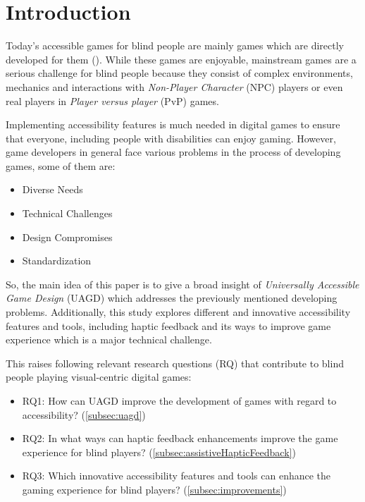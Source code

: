 \documentclass[sigconf,natbib=false,10pt]{acmart}
\begin{document}
	\section{Introduction} \label{sec:introduction}
	Today's accessible games for blind people are mainly games which are directly developed for them (\textcite{goncalves_my_2023}).
	While these games are enjoyable, mainstream games are a serious challenge for blind people because they consist of complex environments, mechanics and interactions with \emph{Non-Player Character} (NPC) players or even real players in \emph{Player versus player} (PvP) games.
	
	Implementing accessibility features is much needed in digital games to ensure that everyone, including people with disabilities can enjoy gaming.
	However, game developers in general face various problems in the process of developing games, some of them are:
	
	\begin{itemize}
		\setlength\itemsep{0.5em}
		\item Diverse Needs
		\item Technical Challenges
		\item Design Compromises
		\item Standardization
	\end{itemize}
	
	So, the main idea of this paper is to give a broad insight of \emph{Universally Accessible Game Design} (UAGD) which addresses the previously mentioned developing problems.
	Additionally, this study explores different and innovative accessibility features and tools, including haptic feedback and its ways to improve game experience which is a major technical challenge.
	
	This raises following relevant research questions (RQ) that contribute to blind people playing visual-centric digital games:
	
	\begin{itemize}
		\setlength\itemsep{0.5em}
		\item RQ1: How can UAGD improve the development of games with regard to accessibility? (\autoref{subsec:uagd})
		\item RQ2: In what ways can haptic feedback enhancements improve the game experience for blind players? (\autoref{subsec:assistiveHapticFeedback})
		\item RQ3: Which innovative accessibility features and tools can enhance the gaming experience for blind players? (\autoref{subsec:improvements})
	\end{itemize}
\end{document}
